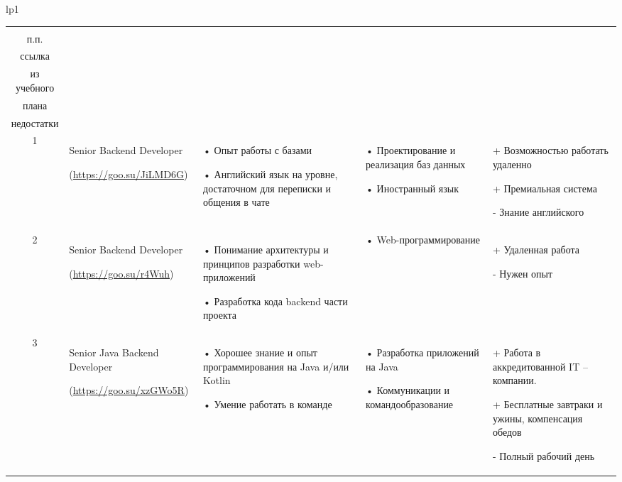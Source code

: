 \documentclass[14pt]{extreport}
\begin{document}
\begin{landscape}
\begin{longtable}[H]{lp{1\linewidth}}
\centering

\begin{small}


    \begin{tabular}{|c|p{}|p{6cm}|p{5cm}|p{5cm}|}
	\hline 
	\makecell{№ \\ п.п.} &	\makecell{Название должности,\\ ссылка} &	\makecell{Требования} & 	\makecell{Дисциплины \\ из учебного \\плана} &	\makecell{Преимущества и \\недостатки}  \\ 
	\hline 
	1	& Senior Backend Developer 
	
(\url{https://goo.su/JiLMD6G}) &
•	Опыт работы с базами

•	Английский язык на уровне, достаточном для переписки и общения в чате &
•	Проектирование и реализация баз данных

•	Иностранный язык &
+	Возможностью работать удаленно

+	Премиальная система

-	Знание английского \\


	\hline
	2	& Senior Backend Developer
	
(\url{https://goo.su/r4Wuh}) &
•	Понимание архитектуры и принципов разработки web-приложений

•	Разработка кода backend части проекта &
•	Web-программирование &
+	Удаленная работа

-	Нужен опыт
\\

	\hline 
	3	& Senior Java Backend Developer
	
(\url{https://goo.su/xzGWo5R}) 	&
•	Хорошее знание и опыт программирования на Java и/или Kotlin

•	Умение работать в команде &
•	Разработка приложений на Java

•	Коммуникации и командообразование &
+	Работа в аккредитованной IT – компании.

+	Бесплатные завтраки и ужины, компенсация обедов

-	Полный рабочий день \\


	\hline


    \end{tabular}
    \end{small}
\end{longtable}


\end{landscape}
\end{document}
